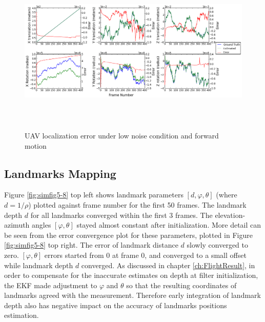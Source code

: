 \begin{figure}[h]
\centering
\includegraphics[width=16cm, height=8cm]{./Figures/SimulationFigures/Figure1.png}
\caption{UAV localization error under low noise condition and forward motion}
\label{fig:simfig1}
\end{figure}
\FloatBarrier

\subsection{Landmarks Mapping}
Figure \ref{fig:simfig5-8} top left shows landmark parameters $[d,
\varphi ,\theta]$ (where $d=1/\rho $) plotted against frame number for
the first 50 frames. The landmark depth $d$ for all landmarks
converged within the first 3 frames. The elevation-azimuth angles
$[\varphi ,\theta]$ stayed almost constant after initialization. More
detail can be seen from the error convergence plot for these
parameters, plotted in Figure \ref{fig:simfig5-8} top right. The error
of landmark distance $d$ slowly converged to zero. $[\varphi ,\theta]$
errors started from 0 at frame 0, and converged to a small offset
while landmark depth $d$ converged. As discussed in chapter
\ref{ch:FlightResult}, in order to compensate for the inaccurate
estimates on depth at filter initialization, the EKF made adjustment
to $\varphi$ and $\theta$ so that the resulting coordinates of
landmarks agreed with the measurement. Therefore early integration of
landmark depth also has negative impact on the accuracy of landmarks
positions estimation.

